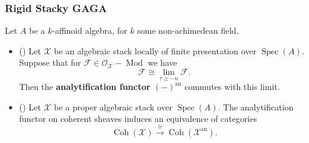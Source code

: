 \documentclass[handout]{beamer}
\numberwithin{equation}{section}
\numberwithin{case}{theorem}
\newcommand{\cF}{\mathcal{F}}		%
\newcommand{\cG}{\mathcal{G}}		%
\newcommand{\cO}{\mathcal{O}}		%
\newcommand{\sX}{\mathscr{X}}		%
\newcommand{\Spec}{\operatorname{Spec}} %
\newcommand{\<}{\left\langle}
\renewcommand{\>}{\right\rangle}
\begin{document}
	\begin{frame}
		\frametitle{Rigid Stacky GAGA}
		
		\begin{theorem} Let $A$ be a $k$-affinoid algebra, for $k$ some non-achimedean field. 
		\begin{itemize}
			\item[](\cite[Lemma $7.2$]{Porta-Yu-Higher-analytic-stacks-GAGA}) Let $\sX$ be an algebraic stack locally of finite presentation over $\Spec(A).$ Suppose that for $\cF\in \cO_{\sX}-\operatorname{Mod}$ we have 
			\[\cF\cong\lim_{\tau\geq -n} \cF.\]
			Then the \textbf{analytification functor $(-)^{\text{an}}$} commutes with this limit. 
			
			\pause
			
			\item[](\cite[Theorems $7.4$ and $7.5$]{Porta-Yu-Higher-analytic-stacks-GAGA}) Let $\sX$ be a proper algebraic stack over $\Spec(A).$ \pause The analytification functor on coherent sheaves induces an equivalence of categories \pause
			\[\operatorname{Coh}(\sX)\overset{\cong}{\to} \operatorname{Coh}(\sX^{\text{an}}).\] 
			
		\end{itemize}
		\end{theorem}
	\end{frame}
	
\end{document}
